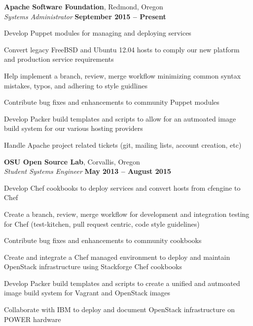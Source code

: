 \documentclass[margin,line]{resume}
\begin{document}
\begin{resume}
    \textbf{Apache Software Foundation}, Redmond, Oregon \vspace{2mm}\\\vspace{1mm}%
    \textsl{Systems Administrator} \hfill \textbf{September 2015 -- Present}\\
    \begin{list2}
        \item Develop Puppet modules for managing and deploying services
        \item Convert legacy FreeBSD and Ubuntu 12.04 hosts to comply our new platform and production service requirements
        \item Help implement a branch, review, merge workflow minimizing common syntax mistakes, typos, and adhering to style guidlines
        \item Contribute bug fixes and enhancements to community Puppet modules
        \item Develop Packer build templates and scripts to allow for an autmoated image build system for our various hosting providers\\
        \item Handle Apache project related tickets (git, mailing lists, account creation, etc)
    \end{list2}\vspace{-1.5mm}


    \textbf{OSU Open Source Lab}, Corvallis, Oregon \vspace{2mm}\\\vspace{1mm}%
    \textsl{Student Systems Engineer} \hfill \textbf{May 2013 -- August 2015}\\
    \begin{list2}
        \item Develop Chef cookbooks to deploy services and convert hosts from cfengine to Chef
        \item Create a branch, review, merge workflow for development and integration testing for Chef (test-kitchen, pull request centric, code style guidelines)
        \item Contribute bug fixes and enhancements to community cookbooks
        \item Create and integrate a Chef managed environment to deploy and maintain OpenStack infrastructure using Stackforge Chef cookbooks
        \item Develop Packer build templates and scripts to create a unified and autmoated image build system for Vagrant and OpenStack images
        \item Collaborate with IBM to deploy and document OpenStack infrastructure on POWER hardware\\
    \end{list2}\vspace{-1.5mm}



\end{resume}
\end{document}
